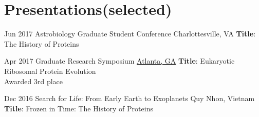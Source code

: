 \documentclass[letterpaper]{twentysecondcv} %
\begin{document}
\section{Presentations\scriptsize{(selected)}}

\begin{twenty} %
\twentyitem
    	{Jun 2017}
		{}
        {Astrobiology Graduate Student Conference}
        {{Charlottesville, VA}}
        {\textbf{Title}: The History of Proteins}

	\twentyitem
    	{Apr 2017}
		{}
        {Graduate Research Symposium}
        {\href{http://www.calendar.gatech.edu/event/590513}{Atlanta, GA}}
        {\textbf{Title}: Eukaryotic Ribosomal Protein Evolution \\ Awarded 3rd place}

	\twentyitem
    	{Dec 2016}
		{}
        {Search for Life: From Early Earth to Exoplanets}
        {{Quy Nhon, Vietnam}}
        {\textbf{Title}: Frozen in Time: The History of Proteins}

\end{twenty}
\end{document}
